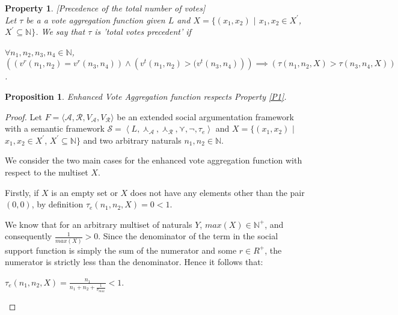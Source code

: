\documentclass{article}
\newtheorem{property}{Property}
\newtheorem{proposition}{Proposition}
\newcommand{\nat}{\mathbb{N}}   %
\newcommand{\args}{\mathcal{A}} %
\newcommand{\att}{\mathcal{R}}  %
\newcommand{\valueset}{L}
\newcommand{\varg}{V_{\args}}   %
\newcommand{\vatt}{V_{\att}}   %
\newcommand{\safid}{F}               %
\newcommand{\saf}{\safid = \safbody} %
\newcommand{\safbody}{\langle \args, \att, \varg, \vatt \rangle} %
\newcommand{\sembodyNewB}{\left\langle \valueset,\SAFand_\mathcal{A}, \SAFand_\mathcal{R},\SAFor,\lnot,\tau_{e} \right\rangle} %
\newcommand{\SAFand}{\curlywedge}     %
\newcommand{\SAFor}{\curlyvee}        %
\newcommand{\sem}{\mathcal{S}}
\begin{document}
\begin{property}
\label{P3}[Precedence of the total number of votes] \\
Let $\tau$ be a a vote aggregation function given $\valueset$ and $X = \{(x_{1}, x_{2})$ $|$ $x_{1}, x_{2} \in X^{'}$, $X^{'} \subseteq \nat \}$. We say that $\tau$ is 'total votes precedent' if
\begin{center}
 $\forall n_1, n_2, n_3, n_4 \in \nat$,  \\
$\left( \left(v^{r}(n_{1}, n_{2}) = v^{r}(n_{3}, n_{4}) \right) \land  \left( v^{t}(n_{1}, n_{2}) > ( v^{t}(n_{3}, n_{4}) \right) \right) \implies \left( \tau(n_{1}, n_{2}, X) > \tau(n_{3}, n_{4}, X) \right)$. 
\\

\end{center}
\end{property}






\begin{proposition}
Enhanced Vote Aggregation function respects Property \ref{P1}.
\end{proposition}

\begin{proof} %
Let $\saf$ be an extended social argumentation framework with a semantic framework $\sem = \sembodyNewB$ and $X = \{(x_{1}, x_{2})$ $|$ $x_{1}, x_{2} \in X^{'}$, $X^{'} \subseteq \nat \}$ and two arbitrary naturals $n_1, n_2 \in \nat$.

We consider the two main cases for the enhanced vote aggregation function with respect to the multiset $X$.

Firstly, if $X$ is an empty set or $X$ does not have any elements other than the pair $(0, 0)$, by definition $\tau_{e}(n_1, n_2, X) = 0 < 1$.

We know that for an arbitrary multiset of naturals $Y$, $max(X)  \in \nat^+$, and consequently $\frac{1}{max(X)} > 0$. Since the denominator of the term in the social support function is simply the sum of the numerator and some $r \in {R}^+ $, the numerator is strictly less than the denominator. Hence it follows that: \\
\begin{center}
$ \tau_{e}(n_{1}, n_{2},  X) = \frac{n_{1}}{n_{1} + n_{2}+\frac{1}{v_{max}}} < 1$.
\end{center}
\end{proof}
\end{document}
